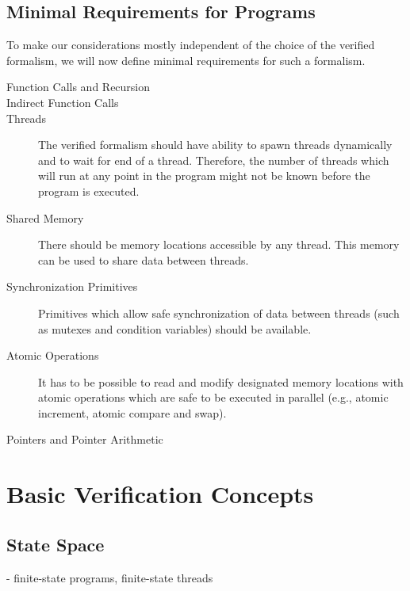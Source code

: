 \subsection{Minimal Requirements for Programs}

To make our considerations mostly independent of the choice of the verified formalism, we will now define minimal requirements for such a formalism.

\begin{description}
    \item[Function Calls and Recursion]
    \item[Indirect Function Calls]
    \item[Threads] The verified formalism should have ability to spawn threads dynamically and to wait for end of a thread.
        Therefore, the number of threads which will run at any point in the program might not be known before the program is executed.
    \item[Shared Memory] There should be memory locations accessible by any thread. This memory can be used to share data between threads.
    \item[Synchronization Primitives] Primitives which allow safe synchronization of data between threads (such as mutexes and condition variables) should be available.
    \item[Atomic Operations] It has to be possible to read and modify designated memory locations with atomic operations which are safe to be executed in parallel (e.g., atomic increment, atomic compare and swap).
    \item[Pointers and Pointer Arithmetic]
\end{description}

\section{Basic Verification Concepts}

\subsection{State Space}

- finite-state programs, finite-state threads

